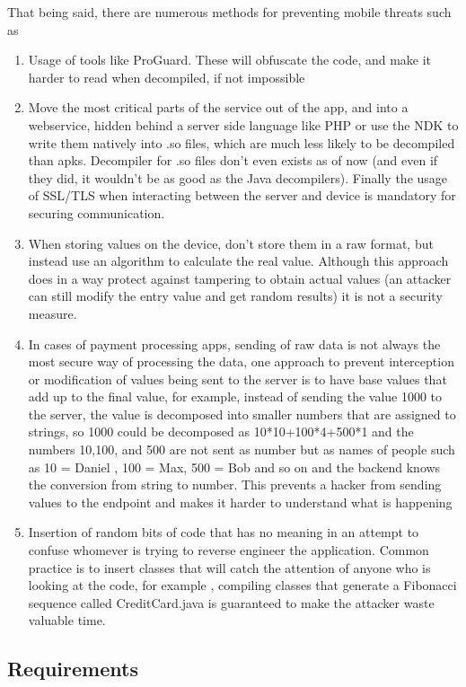 That being said, there are numerous methods for preventing mobile threats such as
\begin{enumerate}
	\item{Usage of tools like ProGuard. These will obfuscate the code, and make it harder to read when decompiled, if not impossible}
	\item{Move the most critical parts of the service out of the app, and into a webservice, hidden behind a server side language like PHP or use the NDK to write them natively into .so files, which are much less likely to be decompiled than apks. Decompiler for .so files don't even exists as of now (and even if they did, it wouldn't be as good as the Java decompilers). Finally the usage of SSL/TLS when interacting between the server and device is mandatory for securing communication.}
	\item{When storing values on the device, don't store them in a raw format, but instead use an algorithm to calculate the real value. Although this approach does in a way protect against tampering to obtain actual values (an attacker can still modify the entry value and get random results) it is not a security measure.}
	\item{In cases of payment processing apps, sending of raw data is not always the most secure way of processing the data, one approach to prevent interception or modification of values being sent to the server is to have base values that add up to the final value, for example, instead of sending the value 1000 to the server, the value is decomposed into smaller numbers that are assigned to strings, so 1000 could be decomposed as 10*10+100*4+500*1 and the numbers 10,100, and 500 are not sent as number but as names of people such as 10 = Daniel , 100 = Max, 500 = Bob and so on and the backend knows the conversion from string to number. This prevents a hacker from sending values to the endpoint and makes it harder to understand what is happening}
	\item{Insertion of random bits of code that has no meaning in an attempt to confuse whomever is trying to reverse engineer the application. Common practice is to insert classes that will catch the attention of anyone who is looking at the code, for example , compiling classes that generate a Fibonacci sequence called CreditCard.java is guaranteed to make the attacker waste valuable time. }
\end{enumerate}

\subsection{Requirements}

